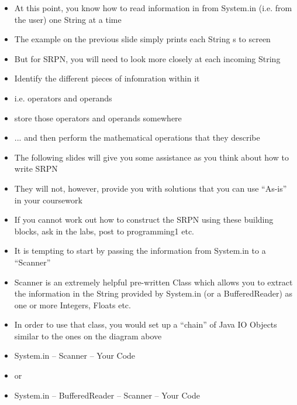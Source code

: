 \documentclass{beamer}
\begin{document}
\begin{frame}
\begin{itemize}
\item At this point, you know how to read information in from System.in (i.e. from the user) one String at a time
\item The example on the previous slide simply prints each String s to screen
\item But for SRPN, you will need to look more closely at each incoming String
\item Identify the different pieces of infomration within it 
\item i.e. operators and operands
\item store those operators and operands somewhere 
\item ... and then perform the mathematical operations that they describe
\end{itemize}
\end{frame}

\begin{frame}
\begin{itemize}
\item The following slides will give you some assistance as you think about how to write SRPN
\item They will not, however, provide you with solutions that you can use ``As-is'' in your coursework
\item If you cannot work out how to construct the SRPN using these building blocks, ask in the labs, post to programming1 etc.
\end{itemize}
\end{frame}


\begin{frame}
\begin{itemize}
\item It is tempting to start by passing the information from System.in  to a ``Scanner''
\item Scanner is an extremely helpful pre-written Class which allows you to extract the information in the String provided by System.in (or a BufferedReader) as one or more Integers, Floats etc.
\item In order to use that class, you would set up a ``chain'' of Java IO Objects similar to the ones on the diagram above
\item System.in -- Scanner -- Your Code
\item or
\item System.in -- BufferedReader -- Scanner -- Your Code
\end{itemize}
\end{frame}
\end{document}
